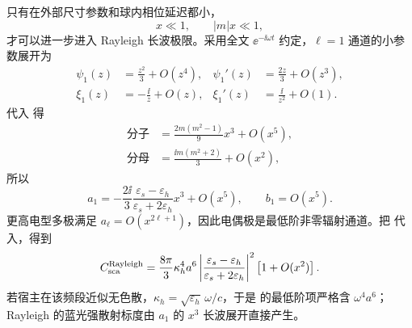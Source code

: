 \begin{exbox}
只有在外部尺寸参数和球内相位延迟都小，
\begin{equation}
{x\ll1,\qquad |m|x\ll1,}
\label{eq:rayleigh-control-dp75}
\end{equation}
才可以进一步进入 Rayleigh 长波极限。采用全文 $\ee^{-\ii\omega t}$ 约定，$\ell=1$ 通道的小参数展开为
\begin{align*}
\psi_1(z)&=\frac{z^2}{3}+O(z^4),
&\psi_1'(z)&=\frac{2z}{3}+O(z^3),\\
\xi_1(z)&=-\frac{\ii}{z}+O(z),
&\xi_1'(z)&=\frac{\ii}{z^2}+O(1).
\end{align*}
代入 得
\begin{align*}
\text{分子}
&=\frac{2m(m^2-1)}{9}x^3+O(x^5),\\
\text{分母}
&=\frac{\ii m(m^2+2)}{3}+O(x^2),
\end{align*}
所以
\begin{equation}
{
 a_1
 =-\frac{2\ii}{3}
 \frac{\varepsilon_s-\varepsilon_h}
 {\varepsilon_s+2\varepsilon_h}
 x^3+O(x^5),
 \qquad
 b_1=O(x^5).}
\label{eq:rayleigh-mie-a1-dp75}
\end{equation}
更高电型多极满足 $a_\ell=O(x^{2\ell+1})$，因此电偶极是最低阶非零辐射通道。把 代入，得到
\begin{equation}
{
 C_{\rm sca}^{\rm Rayleigh}
 =\frac{8\pi}{3}\kappa_h^4a^6
 \left|
 \frac{\varepsilon_s-\varepsilon_h}
 {\varepsilon_s+2\varepsilon_h}
 \right|^2
 \left[1+O(x^2)\right].}
\label{eq:rayleigh-scattering-cross-section-dp75}
\end{equation}
若宿主在该频段近似无色散，$\kappa_h=\sqrt{\varepsilon_h}\,\omega/c$，于是 的最低阶项严格含 $\omega^4a^6$；Rayleigh 的蓝光强散射标度由 $a_1$ 的 $x^3$ 长波展开直接产生。


\end{exbox}
